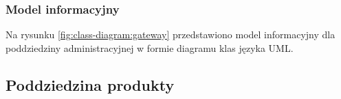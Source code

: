 \subsubsection{Model informacyjny}\label{subsubsec:database:gateway:domainModel}

Na rysunku \ref{fig:class-diagram:gateway} przedstawiono model informacyjny dla poddziedziny administracyjnej w formie diagramu klas języka UML.


\subsection{Poddziedzina produkty}\label{subsec:database:products}

